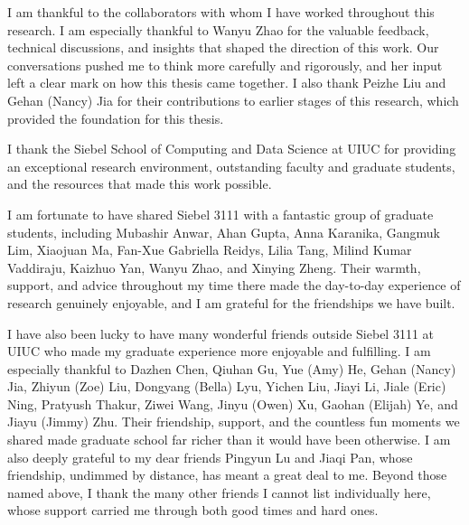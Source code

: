 \documentclass[thesis]{uofithesis} %
\begin{document}
{    I am thankful to the collaborators with whom I have worked throughout
    this research. I am especially thankful to Wanyu Zhao for the valuable
    feedback, technical discussions, and insights that shaped
    the direction of this work. Our conversations pushed me to think more
    carefully and rigorously, and her input left a clear mark on how this
    thesis came together. I also thank Peizhe Liu and Gehan (Nancy) Jia for their
    contributions to earlier stages of this research, which provided the
    foundation for this thesis.

    I thank the Siebel School of Computing and Data Science at UIUC for
    providing an exceptional research environment, outstanding faculty and
    graduate students, and the resources that made this work possible.

    I am fortunate to have shared Siebel 3111 with a fantastic group of
    graduate students, including Mubashir Anwar, Ahan Gupta, Anna Karanika,
    Gangmuk Lim, Xiaojuan Ma, Fan-Xue Gabriella Reidys, Lilia Tang, Milind Kumar Vaddiraju, Kaizhuo
    Yan, Wanyu Zhao, and Xinying Zheng. Their warmth, support, and
    advice throughout my time there made the day-to-day experience of
    research genuinely enjoyable, and I am grateful for the friendships
    we have built.

    I have also been lucky to have many wonderful friends outside Siebel
    3111 at UIUC who made my graduate experience more enjoyable and
    fulfilling. I am especially thankful to Dazhen Chen, Qiuhan Gu, Yue
    (Amy) He, Gehan (Nancy) Jia, Zhiyun (Zoe) Liu, Dongyang (Bella) Lyu,
    Yichen Liu, Jiayi Li, Jiale (Eric) Ning, Pratyush Thakur, Ziwei Wang, Jinyu (Owen) Xu,
    Gaohan (Elijah) Ye, and Jiayu (Jimmy) Zhu. Their friendship, support,
    and the countless fun moments we shared made graduate school far richer
    than it would have been otherwise. I am also deeply grateful to my
    dear friends Pingyun Lu and Jiaqi Pan, whose friendship, undimmed by
    distance, has meant a great deal to me. Beyond those named above, I
    thank the many other friends I cannot list individually here, whose
    support carried me through both good times and hard ones.

}
\end{document}
